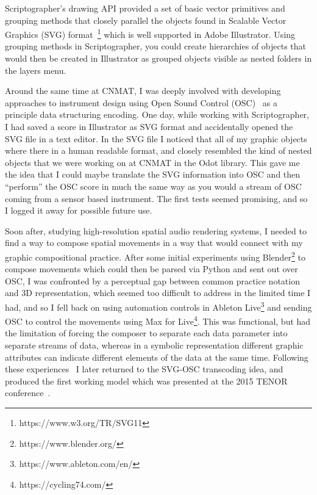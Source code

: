 \documentclass{article}
\begin{document}
Scriptographer's drawing API provided a set of basic vector primitives and grouping methods that closely parallel the objects found in Scalable Vector Graphics (SVG) format~\footnote{https://www.w3.org/TR/SVG11} which is well supported in Adobe Illustrator. Using grouping methods in Scriptographer, you could create hierarchies of objects that would then be created in Illustrator as grouped objects visible as nested folders in the layers menu.

Around the same time at CNMAT, I was deeply involved with developing approaches to instrument design using Open Sound Control (OSC)~\cite{wright:osc} as a principle data structuring encoding. One day, while working with Scriptographer, I had saved a score in Illustrator as SVG format and accidentally opened the SVG file in a text editor. In the SVG file I noticed that all of my graphic objects where there in a human readable format, and closely resembled the kind of nested objects that we were working on at CNMAT in the Odot library\cite{maccallum2015dynamic}. This gave me the idea that I could maybe translate the SVG information into OSC and then ``perform'' the OSC score in much the same way as you would a stream of OSC coming from a sensor based instrument. The first tests seemed promising, and so I logged it away for possible future use.

Soon after, studying high-resolution spatial audio rendering systems, I needed to find a way to compose spatial movements in a way that would connect with my graphic compositional practice. After some initial experiments using Blender\footnote{https://www.blender.org/} to compose movements which could then be parsed via Python and sent out over OSC, I was confronted by a perceptual gap between common practice notation and 3D representation, which seemed too difficult to address in the limited time I had, and so I fell back on using automation controls in Ableton Live\footnote{https://www.ableton.com/en/} and sending OSC to control the movements using Max for Live\footnote{https://cycling74.com/}. This was functional, but had the limitation of forcing the composer to separate each data parameter into separate streams of data, whereas in a symbolic representation different graphic attributes can indicate different elements of the data at the same time. Following these experiences~\cite{gottfried2013studies} I later returned to the SVG-OSC transcoding idea, and produced the first working model which was presented at the 2015 TENOR conference~\cite{gottfried2015svg}.
\end{document}

